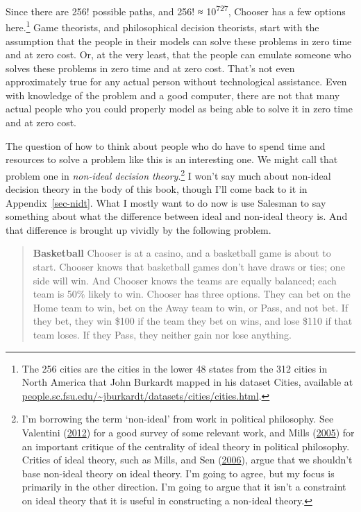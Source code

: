 \documentclass[
  12pt,
  letterpaper,
  DIV=11,
  numbers=noendperiod]{scrreprt}
\begin{document}
Since there are 256! possible paths, and 256! ≈ 10\textsuperscript{727},
Chooser has a few options here.\footnote{The 256 cities are the cities
  in the lower 48 states from the 312 cities in North America that John
  Burkardt mapped in his dataset Cities, available at
  \href{https://people.sc.fsu.edu/~jburkardt/datasets/cities/cities.html}{people.sc.fsu.edu/\textasciitilde jburkardt/datasets/cities/cities.html}.}
Game theorists, and philosophical decision theorists, start with the
assumption that the people in their models can solve these problems in
zero time and at zero cost. Or, at the very least, that the people can
emulate someone who solves these problems in zero time and at zero cost.
That's not even approximately true for any actual person without
technological assistance. Even with knowledge of the problem and a good
computer, there are not that many actual people who you could properly
model as being able to solve it in zero time and at zero cost.

The question of how to think about people who do have to spend time and
resources to solve a problem like this is an interesting one. We might
call that problem one in \emph{non-ideal decision theory}.\footnote{I'm
  borrowing the term `non-ideal' from work in political philosophy. See
  Valentini (\protect\hyperlink{ref-Valentini2012}{2012}) for a good
  survey of some relevant work, and Mills
  (\protect\hyperlink{ref-Mills2005}{2005}) for an important critique of
  the centrality of ideal theory in political philosophy. Critics of
  ideal theory, such as Mills, and Sen
  (\protect\hyperlink{ref-Sen2006}{2006}), argue that we shouldn't base
  non-ideal theory on ideal theory. I'm going to agree, but my focus is
  primarily in the other direction. I'm going to argue that it isn't a
  constraint on ideal theory that it is useful in constructing a
  non-ideal theory.} I won't say much about non-ideal decision theory in
the body of this book, though I'll come back to it in
Appendix~\ref{sec-nidt}. What I mostly want to do now is use Salesman to
say something about what the difference between ideal and non-ideal
theory is. And that difference is brought up vividly by the following
problem.

\begin{quote}
\textbf{Basketball} Chooser is at a casino, and a basketball game is
about to start. Chooser knows that basketball games don't have draws or
ties; one side will win. And Chooser knows the teams are equally
balanced; each team is 50\% likely to win. Chooser has three options.
They can bet on the Home team to win, bet on the Away team to win, or
Pass, and not bet. If they bet, they win \$100 if the team they bet on
wins, and lose \$110 if that team loses. If they Pass, they neither gain
nor lose anything.
\end{quote}
\end{document}
